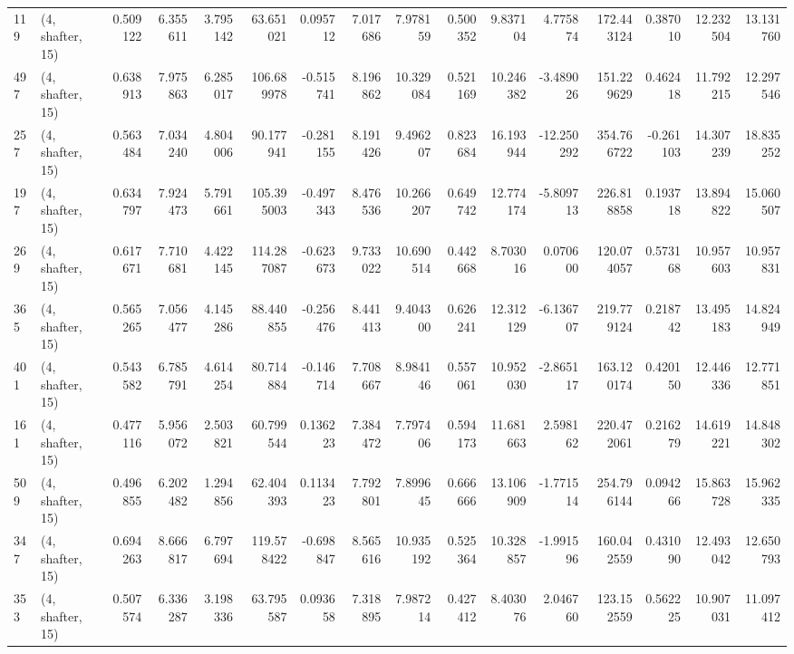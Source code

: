 \begin{tabular}{llrrrrrrrrrrrrrr}
119 &  (4, shafter, 15) &   0.509122 &   6.355611 &   3.795142 &    63.651021 &   0.095712 &   7.017686 &   7.978159 &  0.500352 &   9.837104 &   4.775874 &   172.443124 &  0.387010 &  12.232504 &  13.131760 \\
497 &  (4, shafter, 15) &   0.638913 &   7.975863 &   6.285017 &   106.689978 &  -0.515741 &   8.196862 &  10.329084 &  0.521169 &  10.246382 &  -3.489026 &   151.229629 &  0.462418 &  11.792215 &  12.297546 \\
257 &  (4, shafter, 15) &   0.563484 &   7.034240 &   4.804006 &    90.177941 &  -0.281155 &   8.191426 &   9.496207 &  0.823684 &  16.193944 & -12.250292 &   354.766722 & -0.261103 &  14.307239 &  18.835252 \\
197 &  (4, shafter, 15) &   0.634797 &   7.924473 &   5.791661 &   105.395003 &  -0.497343 &   8.476536 &  10.266207 &  0.649742 &  12.774174 &  -5.809713 &   226.818858 &  0.193718 &  13.894822 &  15.060507 \\
269 &  (4, shafter, 15) &   0.617671 &   7.710681 &   4.422145 &   114.287087 &  -0.623673 &   9.733022 &  10.690514 &  0.442668 &   8.703016 &   0.070600 &   120.074057 &  0.573168 &  10.957603 &  10.957831 \\
365 &  (4, shafter, 15) &   0.565265 &   7.056477 &   4.145286 &    88.440855 &  -0.256476 &   8.441413 &   9.404300 &  0.626241 &  12.312129 &  -6.136707 &   219.779124 &  0.218742 &  13.495183 &  14.824949 \\
401 &  (4, shafter, 15) &   0.543582 &   6.785791 &   4.614254 &    80.714884 &  -0.146714 &   7.708667 &   8.984146 &  0.557061 &  10.952030 &  -2.865117 &   163.120174 &  0.420150 &  12.446336 &  12.771851 \\
161 &  (4, shafter, 15) &   0.477116 &   5.956072 &   2.503821 &    60.799544 &   0.136223 &   7.384472 &   7.797406 &  0.594173 &  11.681663 &   2.598162 &   220.472061 &  0.216279 &  14.619221 &  14.848302 \\
509 &  (4, shafter, 15) &   0.496855 &   6.202482 &   1.294856 &    62.404393 &   0.113423 &   7.792801 &   7.899645 &  0.666666 &  13.106909 &  -1.771514 &   254.796144 &  0.094266 &  15.863728 &  15.962335 \\
347 &  (4, shafter, 15) &   0.694263 &   8.666817 &   6.797694 &   119.578422 &  -0.698847 &   8.565616 &  10.935192 &  0.525364 &  10.328857 &  -1.991596 &   160.042559 &  0.431090 &  12.493042 &  12.650793 \\
353 &  (4, shafter, 15) &   0.507574 &   6.336287 &   3.198336 &    63.795587 &   0.093658 &   7.318895 &   7.987214 &  0.427412 &   8.403076 &   2.046760 &   123.152559 &  0.562225 &  10.907031 &  11.097412 \\

\end{tabular}
